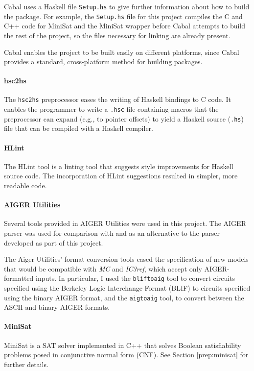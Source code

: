 \documentclass[12pt,a4paper,twoside,openright]{report}
\begin{document}
{{Cabal uses a Haskell file \verb,Setup.hs, to give further information
about how to build the package. For example, the \verb,Setup.hs, file
for this project compiles the C and C++ code for MiniSat and the MiniSat
wrapper before Cabal attempts to build the rest of the project, so the
files necessary for linking are already present.

Cabal enables the project to be built easily on different platforms,
since Cabal provides a standard, cross-platform method for building packages.}

\paragraph{hsc2hs}{
The \verb,hsc2hs, preprocessor \cite{hsc2hs} eases the writing of Haskell bindings to C
code.
It enables the programmer to write a \verb,.hsc, file containing
macros that the preprocessor can expand (e.g., to pointer offsets)
to yield a Haskell source (\verb,.hs,) file that can be compiled with a
Haskell compiler.
}

\paragraph{HLint}{
The HLint tool \cite{hlint} is a linting tool that suggests style improvements for
Haskell source code.
The incorporation of HLint suggestions resulted in simpler, more readable code.
}

\paragraph{AIGER Utilities}{
Several tools provided in AIGER Utilities \cite{aiger} were used in this project.
The
AIGER parser was used for comparison with and as an alternative
to the parser developed as part of this project. 

The Aiger Utilities' format-conversion tools
eased the specification of new models that would
be compatible with \emph{MC} and \emph{IC3ref},
which accept only AIGER-formatted inputs.
In particular, I used the {\tt bliftoaig}
tool to convert circuits specified using the Berkeley Logic Interchange Format (BLIF)
to circuits specified using the binary AIGER format, and the {\tt aigtoaig} tool,
to convert between the ASCII and binary AIGER formats. }

\paragraph{MiniSat}{
MiniSat \cite{minisat,een05}
is a SAT solver implemented in C++ that solves Boolean satisfiability problems
posed in conjunctive normal form (CNF). See Section \ref{prep:minisat} for further
details.
}

}
\end{document}

